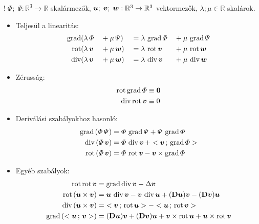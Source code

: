 \documentclass[main.tex]{subfiles}
\begin{document}
$! \; \varPhi; \; \varPsi : \mathbb{R}^3
  \rightarrow \mathbb{R}$ skalármezők,
$\boldsymbol{u}; \; \boldsymbol{v}; \; \boldsymbol{w} : \mathbb{R}^3
  \rightarrow \mathbb{R}^3$ vektormezők,
$\lambda; \mu \in \mathbb{R}$ skalárok.
\begin{itemize}
  \item Teljesül a linearitás:
        \begin{alignat*}{4}
          \operatorname{grad} & (\lambda \, \varPhi  &  & + \mu \, \varPsi)  &  & = \lambda \, \operatorname{grad} \varPhi &  & + \mu \, \operatorname{grad} \varPsi
          \\
          \operatorname{rot}  & (\lambda \, \boldsymbol{v} &  & + \mu \, \boldsymbol{w}) &  & = \lambda \, \operatorname{rot} \boldsymbol{v} &  & + \mu \, \operatorname{rot} \boldsymbol{w}
          \\
          \operatorname{div}  & (\lambda \, \boldsymbol{v} &  & + \mu \, \boldsymbol{w}) &  & = \lambda \, \operatorname{div} \boldsymbol{v} &  & + \mu \, \operatorname{div} \boldsymbol{w}
        \end{alignat*}

  \item Zérusság:
        \begin{alignat*}{1}
          \operatorname{rot} \operatorname{grad} \varPhi & \equiv \boldsymbol{0}
          \\
          \operatorname{div} \operatorname{rot} \boldsymbol{v} & \equiv 0
        \end{alignat*}

  \item Deriválási szabályokhoz hasonló:
        \begin{align*}
          \operatorname{grad} \left( \varPhi \, \varPsi \right)
           & = \varPhi \, \operatorname{grad} \varPsi
          + \varPsi \, \operatorname{grad} \varPhi
          \\
          \operatorname{div} \left( \varPhi \, \boldsymbol{v} \right)
           & = \varPhi \, \operatorname{div} \boldsymbol{v} \,
          + < \boldsymbol{v} \, ; \, \operatorname{grad} \varPhi >
          \\
          \operatorname{rot} \left( \varPhi \, \boldsymbol{v} \right)
           & = \varPhi \, \operatorname{rot} \boldsymbol{v}
          - \boldsymbol{v} \times \operatorname{grad} \varPhi
        \end{align*}

  \item Egyéb szabályok:
        \begin{align*}
          \operatorname{rot} \operatorname{rot} \boldsymbol{v}
           & =\operatorname{grad} \operatorname{div} \boldsymbol{v}
          - \Delta \boldsymbol{v}
          \\
          \operatorname{rot} \left( \boldsymbol{u} \times \boldsymbol{v} \right)
           & = \boldsymbol{u} \, \operatorname{div} \boldsymbol{v}
          - \boldsymbol{v} \, \operatorname{div} \boldsymbol{u}
          + (\mathbf{D} \boldsymbol{u}) \boldsymbol{v}
          - (\mathbf{D} \boldsymbol{v}) \boldsymbol{u}
          \\
          \operatorname{div} \left( \boldsymbol{u} \times \boldsymbol{v} \right)
           & = \; < \boldsymbol{v} \, ; \, \operatorname{rot} \boldsymbol{u} >
          - < \boldsymbol{u} \, ; \, \operatorname{rot} \boldsymbol{v} >
          \\
          \operatorname{grad} \left( < \boldsymbol{u} \, ; \, \boldsymbol{v} > \right)
           & = (\mathbf{D} \boldsymbol{u}) \boldsymbol{v}
          + (\mathbf{D} \boldsymbol{v}) \boldsymbol{u}
          + \boldsymbol{v} \times \operatorname{rot} \boldsymbol{u}
          + \boldsymbol{u} \times \operatorname{rot} \boldsymbol{v}
        \end{align*}
\end{itemize}
\end{document}

